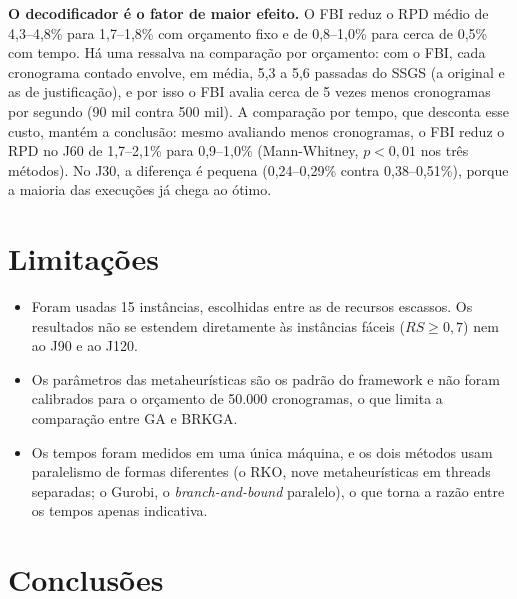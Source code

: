 \documentclass[11pt,a4paper]{article}
\begin{document}
\textbf{O decodificador é o fator de maior efeito.} O FBI reduz o RPD médio de 4,3--4,8\% para
1,7--1,8\% com orçamento fixo e de 0,8--1,0\% para cerca de 0,5\% com tempo. Há uma ressalva na
comparação por orçamento: com o FBI, cada cronograma contado envolve, em média, 5,3 a 5,6 passadas
do SSGS (a original e as de justificação), e por isso o FBI avalia cerca de 5 vezes menos
cronogramas por segundo (90 mil contra 500 mil). A comparação por tempo, que desconta esse custo,
mantém a conclusão: mesmo avaliando menos cronogramas, o FBI reduz o RPD no J60 de 1,7--2,1\% para
0,9--1,0\% (Mann-Whitney, $p < 0{,}01$ nos três métodos). No J30, a diferença é pequena
(0,24--0,29\% contra 0,38--0,51\%), porque a maioria das execuções já chega ao ótimo.

\FloatBarrier
\section{Limitações}

\begin{itemize}
  \item Foram usadas 15 instâncias, escolhidas entre as de recursos escassos. Os resultados não se
        estendem diretamente às instâncias fáceis ($RS \ge 0{,}7$) nem ao J90 e ao J120.
  \item Os parâmetros das metaheurísticas são os padrão do framework e não foram calibrados para o
        orçamento de 50.000 cronogramas, o que limita a comparação entre GA e BRKGA.
  \item Os tempos foram medidos em uma única máquina, e os dois métodos usam paralelismo de formas
        diferentes (o RKO, nove metaheurísticas em threads separadas; o Gurobi, o
        \emph{branch-and-bound} paralelo), o que torna a razão entre os tempos apenas indicativa.
\end{itemize}

\section{Conclusões}
\end{document}
